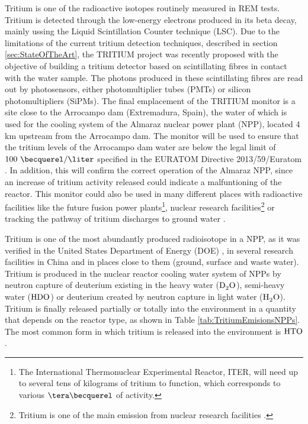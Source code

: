 Tritium is one of the radioactive isotopes routinely measured in REM tests. Tritium is detected through the low-energy electrons produced in its beta decay, mainly ussing the Liquid Scintillation Counter technique (LSC). Due to the limitations of the current tritium detection techniques, described in section \ref{sec:StateOfTheArt}, the TRITIUM project was recently proposed with the objective of building a tritium detector based on scintillating fibres in contact with the water sample. The photons produced in these scintillating fibres are read out by photosensors, either photomultiplier tubes (PMTs) or silicon photomultipliers (SiPMs). The final emplacement of the TRITIUM monitor is a site close to the Arrocampo dam (Extremadura, Spain), the water of which is used for the cooling system of the Almaraz nuclear power plant (NPP), located 4 km upstream from the Arrocampo dam. The monitor will be used to ensure that the tritium levels of the Arrocampo dam  water are below the legal limit of $100~\becquerel/\liter$ specified in the EURATOM Directive 2013/59/Euratom \cite{100BqL}. In addition, this will confirm the correct operation of the Almaraz NPP, since an increase of tritium activity released could indicate a malfuntioning of the reactor. This monitor could also be used in many different places with radioactive facilities like the future fusion power plants\footnote{The International Thermonuclear Experimental Reactor, ITER, will need up to several tens of kilograms of tritium to function, which corresponds to various $\tera\becquerel$ of activity.}, nuclear research facilities\footnote{Tritium is one of the main emission from nuclear research facilities \cite{FERMILAB, BrookHavenNationalLaboratory}.} or tracking the pathway of tritium discharges to ground water \cite{TrackingTritium}. 

Tritium is one of the most abundantly produced radioisotope in a NPP, as it was verified in the United States Department of Energy (DOE) \cite{FiberDetector1a, FiberDetector1b}, in several research facilities in China \cite{CommonEmissionTritium} and in places close to them (ground, surface and waste water). Tritium is produced in the nuclear reactor cooling water system of NPPs by neutron capture of deuterium existing in the heavy water ($\ce{D_2 O}$), semi-heavy water ($\ce{H D O}$) or deuterium created by neutron capture in light water ($\ce{H_2 O}$). Tritium is finally released partially or totally into the environment in a quantity that depends on the reactor type, as shown in Table \ref{tab:TritiumEmisionsNPPs}. The most common form in which tritium is released into the environment is $\ce{HTO}$ \cite{CommonEmissionTritium}.

